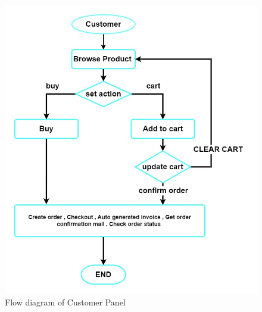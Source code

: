 \begin{figure}[ht]
    \centering  
    \includegraphics[width=\textwidth, height=0.7\textheight]{modified flow diagram/customer flow diagram modified.jpg}    
    \caption{Flow diagram of Customer Panel}
    \label{fig:fig 4.10}
\end{figure}
\newpage
